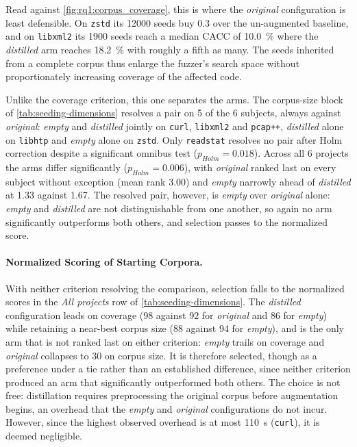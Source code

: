 Read against \cref{fig:rq1:corpus_coverage}, this is where the \emph{original} configuration is least defensible.
On \texttt{zstd} its \num{12000} seeds buy \SI[explicit-sign]{+0.3}{\pp} over the un-augmented baseline, and on \texttt{libxml2} its \num{1900} seeds reach a median \ac{CACC} of \SI{10.0}{\percent} where the \emph{distilled} arm reaches \SI{18.2}{\percent} with roughly a fifth as many.
The seeds inherited from a complete corpus thus enlarge the fuzzer's search space without proportionately increasing coverage of the affected code.

Unlike the coverage criterion, this one separates the arms.
The corpus-size block of \cref{tab:seeding-dimensions} resolves a pair on \num{5} of the \num{6} subjects, always against \emph{original}: \emph{empty} and \emph{distilled} jointly on \texttt{curl}, \texttt{libxml2} and \texttt{pcap++}, \emph{distilled} alone on \texttt{libhtp} and \emph{empty} alone on \texttt{zstd}.
Only \texttt{readstat} resolves no pair after Holm correction despite a significant omnibus test ($p_{Holm} = \num{0.018}$).
Across all \num{6} projects the arms differ significantly ($p_{Holm} = \num{0.006}$), with \emph{original} ranked last on every subject without exception (mean rank \num{3.00}) and \emph{empty} narrowly ahead of \emph{distilled} at \num{1.33} against \num{1.67}.
The resolved pair, however, is \emph{empty} over \emph{original} alone: \emph{empty} and \emph{distilled} are not distinguishable from one another, so again no arm significantly outperforms both others, and selection passes to the normalized score.

\paragraph{Normalized Scoring of Starting Corpora.}
With neither criterion resolving the comparison, selection falls to the normalized scores in the \emph{All projects} row of \cref{tab:seeding-dimensions}.
The \emph{distilled} configuration leads on coverage (\num{98} against \num{92} for \emph{original} and \num{86} for \emph{empty}) while retaining a near-best corpus size (\num{88} against \num{94} for \emph{empty}), and is the only arm that is not ranked last on either criterion: \emph{empty} trails on coverage and \emph{original} collapses to \num{30} on corpus size.
It is therefore selected, though as a preference under a tie rather than an established difference, since neither criterion produced an arm that significantly outperformed both others.
The choice is not free: distillation requires preprocessing the original corpus before augmentation begins, an overhead that the \emph{empty} and \emph{original} configurations do not incur.
However, since the highest observed overhead is at most \SI{110}{\second} (\texttt{curl}), it is deemed negligible.

